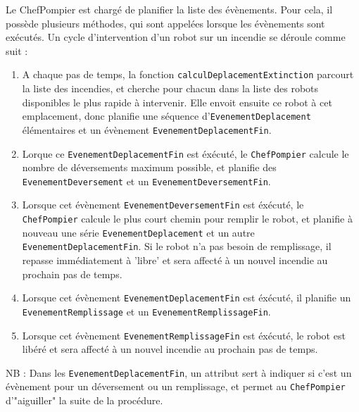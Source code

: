 \documentclass[12pt,a4paper]{article}
\begin{document}
Le ChefPompier est chargé de planifier la liste des évènements. Pour cela, il possède plusieurs méthodes, qui sont appelées lorsque les évènements sont exécutés. Un cycle d'intervention d'un robot sur un incendie se déroule comme suit : 
\begin{enumerate}
	\item A chaque pas de temps, la fonction \verb?calculDeplacementExtinction? parcourt la liste des incendies, et cherche pour chacun dans la liste des robots disponibles le plus rapide à intervenir. Elle envoit ensuite ce robot à cet emplacement, donc planifie une séquence d'\verb?EvenementDeplacement? élémentaires et un évènement \verb?EvenementDeplacementFin?.
	\item Lorque ce \verb?EvenementDeplacementFin? est éxécuté, le \verb?ChefPompier? calcule le nombre de déversements maximum possible, et planifie des \verb?EvenementDeversement? et un \verb?EvenementDeversementFin?.
	\item Lorsque cet évènement \verb?EvenementDeversementFin? est éxécuté, le \verb?ChefPompier? calcule le plus court chemin pour remplir le robot, et planifie à nouveau une série \verb?EvenementDeplacement? et un autre \verb?EvenementDeplacementFin?. Si le robot n'a pas besoin de remplissage, il repasse immédiatement à 'libre' et sera affecté à un nouvel incendie au prochain pas de temps.
	\item Lorsque cet évènement \verb?EvenementDeplacementFin? est éxécuté, il planifie un \verb?EvenementRemplissage? et un \verb?EvenementRemplissageFin?.
	\item Lorsque cet évènement \verb?EvenementRemplissageFin? est éxécuté, le robot est libéré et sera affecté à un nouvel incendie au prochain pas de temps.
\end{enumerate}

NB : Dans les \verb?EvenementDeplacementFin?, un attribut sert à indiquer si c'est un évènement pour un déversement ou un remplissage, et permet au \verb?ChefPompier? d'"aiguiller" la suite de la procédure.
\end{document}
